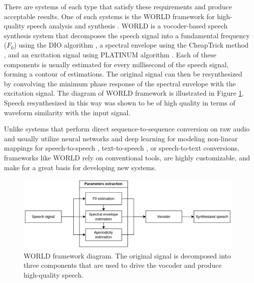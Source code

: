 \documentclass[a4paper]{article}
\begin{document}
There are systems of each type that satisfy these requirements and produce acceptable results. One of such systems is the WORLD framework for high-quality speech analysis and synthesis \cite{WORLD}. WORLD is a vocoder-based speech synthesis system that decomposes the speech signal into a fundamental frequency ($F_0$) using the DIO algorithm \cite{DIO}, a spectral envelope using the CheapTrick method \cite{CheapTrick}, and an excitation signal using PLATINUM algorithm \cite{PLATINUM}. Each of these components is usually estimated for every millisecond of the speech signal, forming a contour of estimations. The original signal can then be resynthesized by convolving the minimum phase response of the spectral envelope with the excitation signal. The diagram of WORLD framework is illustrated in Figure \ref{fig:WORLD_diagram}. Speech resynthesized in this way was shown to be of high quality in terms of waveform similarity with the input signal.

Unlike systems that perform direct sequence-to-sequence conversion on raw audio and usually utilize neural networks and deep learning for modeling non-linear mappings for speech-to-speech \cite{VC1, VC2}, text-to-speech \cite{WaveNet, DeepVoice3}, or speech-to-text \cite{STT1, STT2} conversions, frameworks like WORLD rely on conventional tools, are highly customizable, and make for a great basis for developing new systems.

\begin{figure}
    \includegraphics{graphics/WORLD_diagram.png}
    \caption{WORLD framework diagram. The original signal is decomposed into three components that are used to drive the vocoder and produce high-quality speech.}
    \label{fig:WORLD_diagram}
\end{figure}
\end{document}
